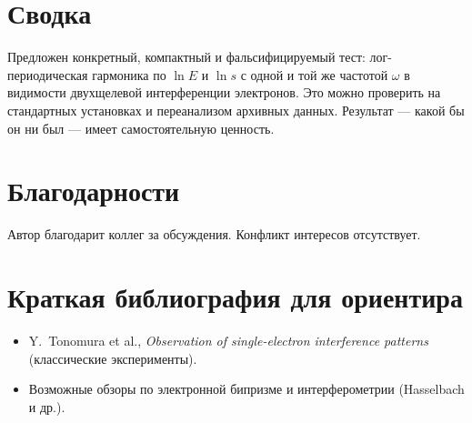 \documentclass[a4paper,12pt]{article}
\begin{document}
\section*{Сводка}
Предложен конкретный, компактный и фальсифицируемый тест: лог-периодическая гармоника по $\ln E$ и $\ln s$
с одной и той же частотой $\omega$ в видимости двухщелевой интерференции электронов. Это можно проверить
на стандартных установках и переанализом архивных данных. Результат --- какой бы он ни был --- имеет самостоятельную ценность.

\section*{Благодарности}
Автор благодарит коллег за обсуждения. Конфликт интересов отсутствует.

\section*{Краткая библиография для ориентира}
\begin{itemize}
  \item Y.~Tonomura et al., \emph{Observation of single-electron interference patterns} (классические эксперименты).
  \item Возможные обзоры по электронной бипризме и интерферометрии (Hasselbach и др.).
\end{itemize}
\end{document}
